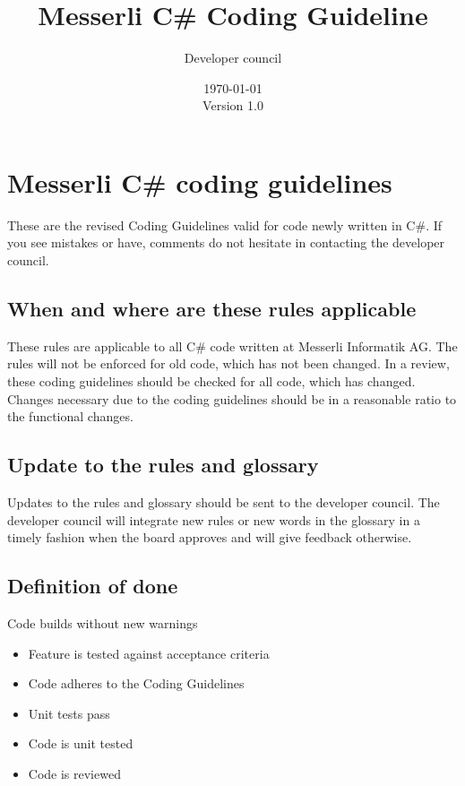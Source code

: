 \documentclass[11pt,a4paper]{article}
\begin{document}
\title{Messerli C\# Coding Guideline}
\author{Developer council}
\date{\today\\Version 1.0}
\maketitle

\inlinetoc

\newpage

\section{Messerli C\# coding guidelines}

These are the revised Coding Guidelines valid for code newly written in C\#.
If you see mistakes or have, comments do not hesitate in contacting the developer council.

\subsection{When and where are these rules applicable}

These rules are applicable to all C\# code written at Messerli Informatik AG. 
The rules will not be enforced for old code, which has not been changed.
In a review, these coding guidelines should be checked for all code, which has changed.
Changes necessary due to the coding guidelines should be in a reasonable ratio to the functional changes.

\subsection{Update to the rules and glossary}

Updates to the rules and glossary should be sent to the developer council. The developer council will integrate new rules or new words in the glossary in a timely fashion when the board approves and will give feedback otherwise.

\subsection{Definition of done}

Code builds without new warnings

\begin{itemize}[itemsep=0pt]
  \item Feature is tested against acceptance criteria
  \item Code adheres to the Coding Guidelines
  \item Unit tests pass
  \item Code is unit tested
  \item Code is reviewed
\end{itemize}
\end{document}
